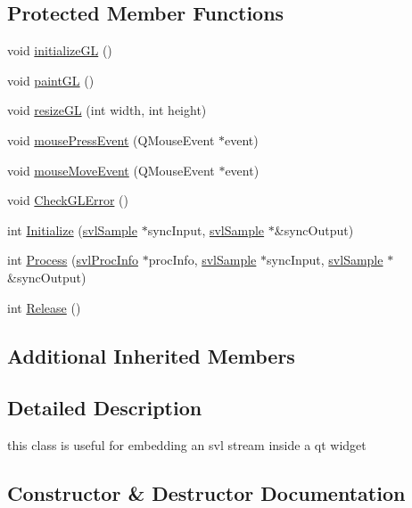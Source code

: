 \subsection*{Protected Member Functions}
\begin{DoxyCompactItemize}
\item 
void \hyperlink{classsvl_filter_image_qt_widget_a72fb0e437786ef03389b4d51d0b594ff}{initialize\+G\+L} ()
\item 
void \hyperlink{classsvl_filter_image_qt_widget_a6ec1f6524b7f549190001a7190cc1e48}{paint\+G\+L} ()
\item 
void \hyperlink{classsvl_filter_image_qt_widget_ad8855463e92eb40848421516076f43bb}{resize\+G\+L} (int width, int height)
\item 
void \hyperlink{classsvl_filter_image_qt_widget_ada707cf4e2657018ad82b3fb2dcee4e5}{mouse\+Press\+Event} (Q\+Mouse\+Event $\ast$event)
\item 
void \hyperlink{classsvl_filter_image_qt_widget_a698ba1d57dcc70498649a703cf8b6d88}{mouse\+Move\+Event} (Q\+Mouse\+Event $\ast$event)
\item 
void \hyperlink{classsvl_filter_image_qt_widget_aa32c1561df8e08a373b056cb31ab159a}{Check\+G\+L\+Error} ()
\item 
int \hyperlink{classsvl_filter_image_qt_widget_a21ae09a4916c06c8093dc80e315695a9}{Initialize} (\hyperlink{classsvl_sample}{svl\+Sample} $\ast$sync\+Input, \hyperlink{classsvl_sample}{svl\+Sample} $\ast$\&sync\+Output)
\item 
int \hyperlink{classsvl_filter_image_qt_widget_a5011dab85054e0a838475aa9dd4cdcaf}{Process} (\hyperlink{structsvl_proc_info}{svl\+Proc\+Info} $\ast$proc\+Info, \hyperlink{classsvl_sample}{svl\+Sample} $\ast$sync\+Input, \hyperlink{classsvl_sample}{svl\+Sample} $\ast$\&sync\+Output)
\item 
int \hyperlink{classsvl_filter_image_qt_widget_a301e6fa770ba91df8eb817085a6f8751}{Release} ()
\end{DoxyCompactItemize}
\subsection*{Additional Inherited Members}


\subsection{Detailed Description}
this class is useful for embedding an svl stream inside a qt widget 

\subsection{Constructor \& Destructor Documentation}
\hypertarget{classsvl_filter_image_qt_widget_ab2cfec921bc96d27bc01837ba5e627b0}{}

